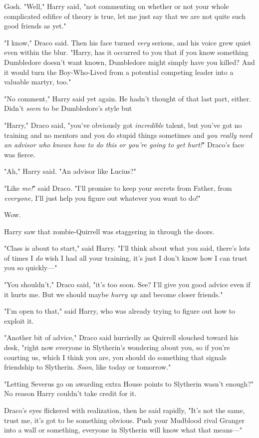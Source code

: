 Gosh. "Well," Harry said, "not commenting on whether or not your whole
complicated edifice of theory is true, let me just say that we are not quite
such good friends as yet."

"I know," Draco said. Then his face turned \emph{very} serious, and his voice
grew quiet even within the blur. "Harry, has it occurred to you that if you
know something Dumbledore doesn't want known, Dumbledore might simply have you
killed? And it would turn the Boy-Who-Lived from a potential competing leader
into a valuable martyr, too."

"No comment," Harry said yet again. He hadn't thought of that last part,
either. Didn't \emph{seem} to be Dumbledore's style{\el} but{\el}

"Harry," Draco said, "you've obviously got \emph{incredible} talent, but you've
got no training and no mentors and you do stupid things sometimes and \emph{you
really need an advisor who knows how to do this or you're going to get hurt!}"
Draco's face was fierce.

"Ah," Harry said. "An advisor like Lucius?"

"Like \emph{me!}" said Draco. "I'll promise to keep your secrets from Father,
from \emph{everyone,} I'll just help you figure out whatever you want to do!"

Wow.

Harry saw that zombie-Quirrell was staggering in through the doors.

"Class is about to start," said Harry. "I'll think about what you said, there's
lots of times I \emph{do} wish I had all your training, it's just I don't know
how I can trust you so quickly\mbox{---}"

"You shouldn't," Draco said, "it's too soon. See? I'll give you good advice
even if it hurts me. But we should maybe \emph{hurry up} and become closer
friends."

"I'm open to that," said Harry, who was already trying to figure out how to
exploit it.

"Another bit of advice," Draco said hurriedly as Quirrell slouched toward his
desk, "right now everyone in Slytherin's wondering about you, so if you're
courting us, which I think you are, you should do something that signals
friendship to Slytherin. \emph{Soon}, like today or tomorrow."

"Letting Severus go on awarding extra House points to Slytherin wasn't enough?"
No reason Harry couldn't take credit for it.

Draco's eyes flickered with realization, then he said rapidly, "It's not the
same, trust me, it's got to be something obvious. Push your Mudblood rival
Granger into a wall or something, everyone in Slytherin will know what that
means\mbox{---}"

